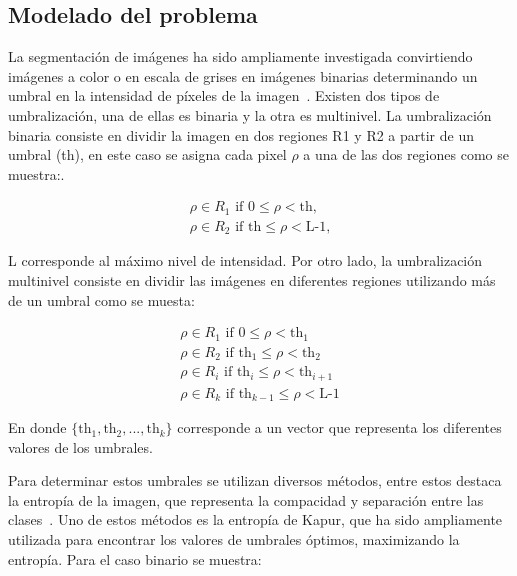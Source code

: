 \documentclass[conference]{IEEEtran}
\begin{document}
\subsection{Modelado del problema}

\noindent La segmentación de imágenes ha sido ampliamente investigada convirtiendo imágenes a color o en escala de grises en imágenes binarias determinando un umbral en la intensidad de píxeles de la imagen~\cite{Sankur2004}. Existen dos tipos de umbralización, una de ellas es binaria y la otra es multinivel. La umbralización binaria consiste en dividir la imagen en dos regiones R1 y R2 a partir de un umbral (th), en este caso se asigna cada pixel $\rho$ a una de las dos regiones como se muestra:.

\begin{equation}
	\begin{gathered}
		\rho \in R_1 \text{ if } 0 \leq \rho < \text{th,} \\
		\rho \in R_2 \text{ if } \text{th} \leq \rho < \text{L-1,}
	\end{gathered}
	\label{eq1}
\end{equation}

\noindent L corresponde al máximo nivel de intensidad.
Por otro lado, la umbralización multinivel consiste en dividir las imágenes en diferentes regiones utilizando más de un umbral como se muesta:

\begin{equation}
	\begin{gathered}
		\rho \in R_1 \text{ if } 0 \leq \rho < \text{th}_1 \\
		\rho \in R_2 \text{ if } \text{th}_1 \leq \rho < \text{th}_2 \\
		\rho \in R_i \text{ if } \text{th}_i \leq \rho < \text{th}_{i+1} \\
		\rho \in R_k \text{ if } \text{th}_{k-1} \leq \rho < \text{L-1}
	\end{gathered}
	\label{eq2}
\end{equation}

\noindent En donde $\{\text{th}_1,\text{th}_2,...,\text{th}_k\}$ corresponde a un vector que representa los diferentes valores de los umbrales.

\noindent Para determinar estos umbrales se utilizan diversos métodos, entre estos destaca la entropía de la imagen, que representa la compacidad y separación entre las clases~\cite{Pun1980}. Uno de estos métodos es la entropía de Kapur, que ha sido ampliamente utilizada para encontrar los valores de umbrales óptimos, maximizando la entropía. Para el caso binario se muestra:
\end{document}
